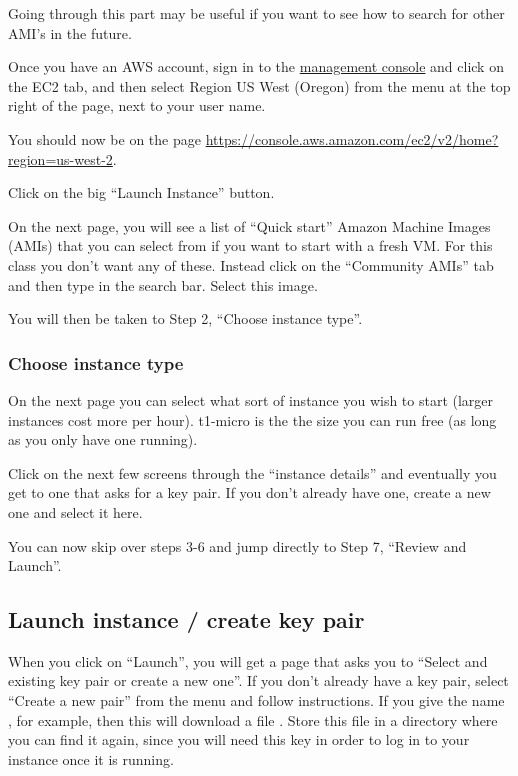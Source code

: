 \documentclass[letterpaper,10pt,english]{sphinxmanual}
\begin{document}
Going through this part may be useful if you want to see how to search for
other AMI's in the future.

Once you have an AWS account, sign in to the
\href{https://console.aws.amazon.com/ec2/}{management console}
and click on the
EC2 tab, and then select Region US West (Oregon) from the menu
at the top right of the page, next to your user name.

You should now be on the page
\url{https://console.aws.amazon.com/ec2/v2/home?region=us-west-2}.

Click on the big ``Launch Instance'' button.

On the next page, you will see a list of ``Quick start''
Amazon Machine Images (AMIs) that
you can select from if you want to start with a fresh VM.  For this class
you don't want any of these.  Instead click on the ``Community AMIs'' tab and
then type  in the search bar.  Select this image.

You will then be taken to Step 2, ``Choose instance type''.


\subsubsection{Choose instance type}
\label{aws:choose-instance-type}\label{aws:aws-instance-type}
On the next page you can select what sort of instance you wish to start (larger
instances cost more per hour). t1-micro is the the size you can run free (as
long as you only have one running).

Click  on the next few screens through the ``instance details''
and eventually you get to one that
asks for a key pair.  If you don't already have one, create a new one and
select it here.

You can now skip over steps 3-6 and jump directly to Step 7, ``Review and
Launch''.


\subsection{Launch instance / create key pair}
\label{aws:launch-instance-create-key-pair}
When you click on ``Launch'', you will get a page that asks you to ``Select and
existing key pair or create a new one''.  If you don't already have a key
pair, select ``Create a new pair'' from the menu and follow instructions.  If
you give the name , for example, then this will download a file
.   Store this file in a directory where you can find it again,
since you will need this key in order to log in to your instance once it is
running.
\end{document}
